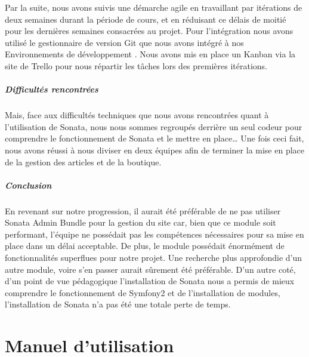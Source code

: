 \documentclass[a4paper,12pt, notitlepage]{report}
\begin{document}
Par la suite, nous avons suivis une démarche agile en travaillant par itérations de deux semaines durant la période de cours, et en réduisant ce délais de moitié pour les dernières semaines consacrées au projet. Pour l’intégration nous avons utilisé le gestionnaire de version Git que nous avons intégré à nos Environnements de développement . Nous avons mis en place un Kanban via la site de Trello pour nous répartir les tâches lors des premières itérations.
 
\subsubsection{Difficultés rencontrées}
Mais, face aux difficultés techniques que nous avons rencontrées quant à l’utilisation de Sonata, nous nous sommes regroupés derrière un seul codeur pour comprendre le fonctionnement  de Sonata et le mettre en place…
Une fois ceci fait, nous avons réussi à nous diviser en deux équipes afin de terminer la mise en place de la gestion des articles et de la boutique.

\subsubsection{Conclusion}
En revenant sur notre progression, il aurait été préférable de ne pas utiliser Sonata Admin Bundle pour la gestion du site car, bien que ce module soit performant, l’équipe ne possédait pas les compétences nécessaires pour sa mise en place dans un délai acceptable. De plus, le module possédait énormément de fonctionnalités superflues pour notre projet. Une recherche plus approfondie d’un autre module, voire s’en passer aurait sûrement été préférable. D’un autre coté, d’un point de vue pédagogique l’installation de Sonata nous a permis de mieux comprendre le fonctionnement de Symfony2 et de l’installation de modules, l’installation de Sonata n’a pas été une totale perte de temps.


\part{Manuel d'utilisation}
\end{document}
